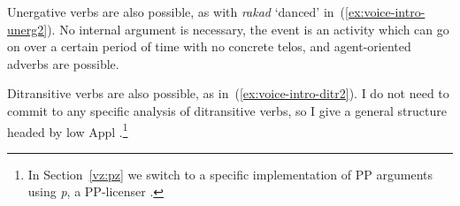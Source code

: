 \begin{exe}
\begin{xlist}
\begin{exe}
\begin{xlist}
\begin{exe}
\begin{xlist}
\begin{exe}
\begin{exe}
\begin{xlist}
\begin{exe}
\begin{xlist}
\begin{exe}
\begin{xlist}
\begin{exe}
\begin{xlist}
\begin{exe}
\begin{xlist}
\begin{exe}
\begin{xlist}
\begin{exe}
\begin{xlist}
\begin{exe}
\begin{xlist}
\begin{exe}
\begin{xlist}
\begin{exe}
\begin{xlist}
\begin{exe}
\begin{xlist}
\begin{exe}
\begin{xlist}
\begin{exe}
\begin{xlist}
\begin{exe}
\begin{exe}
\begin{xlist}
Unergative verbs are also possible, as with \emph{rakad} `danced' in~(\ref{ex:voice-intro-unerg2}). No internal argument is necessary, the event is an activity which can go on over a certain period of time with no concrete telos, and agent-oriented adverbs are possible.

 \begin{exe}
 \ex \label{ex:voice-intro-unerg2} 
 \begin{xlist} 
	
 	 \z
\z 

Ditransitive verbs are also possible, as in~(\ref{ex:voice-intro-ditr2}). I do not need to commit to any specific analysis of ditransitive verbs, so I give a general structure headed by low Appl \citep[18]{pylkkanen08}.\footnote{In Section~\ref{vz:pz} we switch to a specific implementation of PP arguments using \emph{p}, a PP-licenser \citep{koopman97,svenonius03,gehrke08phd,wood15springer}.}

 \begin{exe}
 \ex \label{ex:voice-intro-ditr2} 
 \begin{xlist} 
	
 	 \z
\z 


\end{xlist}
\end{exe}
\end{xlist}
\end{exe}
\end{xlist}
\end{exe}
\end{exe}
\end{xlist}
\end{exe}
\end{xlist}
\end{exe}
\end{xlist}
\end{exe}
\end{xlist}
\end{exe}
\end{xlist}
\end{exe}
\end{xlist}
\end{exe}
\end{xlist}
\end{exe}
\end{xlist}
\end{exe}
\end{xlist}
\end{exe}
\end{xlist}
\end{exe}
\end{xlist}
\end{exe}
\end{xlist}
\end{exe}
\end{xlist}
\end{exe}
\end{exe}
\end{xlist}
\end{exe}
\end{xlist}
\end{exe}
\end{xlist}
\end{exe}
